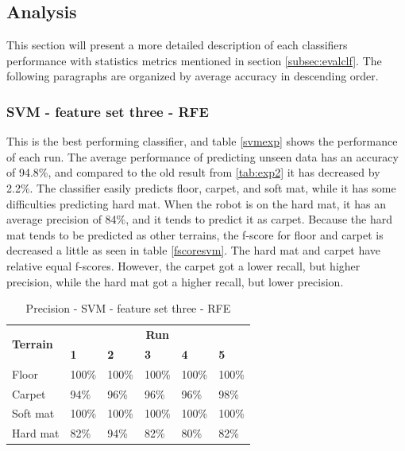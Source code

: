 \documentclass[USenglish]{ifimaster}  %
\begin{document}
\subsection{Analysis}
This section will present a more detailed description of each classifiers performance with statistics metrics mentioned in section \ref{subsec:evalclf}. The following paragraphs are organized by average accuracy in descending order.
\newpage

\subsubsection{SVM - feature set three - RFE} \label{sb:svmwrapper}
This is the best performing classifier, and table \ref{svmexp} shows the performance of each run. The average performance of predicting unseen data has an accuracy of 94.8\%, and compared to the old result from \ref{tab:exp2} it has decreased by 2.2\%. The classifier easily predicts floor, carpet, and soft mat, while it has some difficulties predicting hard mat. When the robot is on the hard mat, it has an average precision of 84\%, and it tends to predict it as carpet. Because the hard mat tends to be predicted as other terrains, the f-score for floor and carpet is decreased a little as seen in table \ref{fscoresvm}. The hard mat and carpet have relative equal f-scores. However, the carpet got a lower recall, but higher precision, while the hard mat got a higher recall, but lower precision.

\begin{table}[h]
	\begin{subtable}[h]{1\textwidth}
		\centering
		\captionsetup{justification=centering}
		\begin{tabular}{@{}llllll@{}}
			\toprule
			\multirow{2}{*}{\textbf{Terrain}} & \multicolumn{5}{c}{\textbf{Run}} \\ \cmidrule(l){2-6} 
			& \multicolumn{1}{l|}{\textbf{1}} & \multicolumn{1}{l|}{\textbf{2}} & \multicolumn{1}{l|}{\textbf{3}} & \multicolumn{1}{l|}{\textbf{4}} & \textbf{5} \\ \midrule
			\multicolumn{1}{l|}{Floor} & \multicolumn{1}{l|}{100\%} & \multicolumn{1}{l|}{100\%} & \multicolumn{1}{l|}{100\%} & \multicolumn{1}{l|}{100\%} & 100\% \\ \midrule
			\multicolumn{1}{l|}{Carpet} & \multicolumn{1}{l|}{94\%} & \multicolumn{1}{l|}{96\%} & \multicolumn{1}{l|}{96\%} & \multicolumn{1}{l|}{96\%} & 98\% \\ \midrule
			\multicolumn{1}{l|}{Soft mat} & \multicolumn{1}{l|}{100\%} & \multicolumn{1}{l|}{100\%} & \multicolumn{1}{l|}{100\%} & \multicolumn{1}{l|}{100\%} & 100\% \\ \midrule
			\multicolumn{1}{l|}{Hard mat} & \multicolumn{1}{l|}{82\%} & \multicolumn{1}{l|}{94\%} & \multicolumn{1}{l|}{82\%} & \multicolumn{1}{l|}{80\%} & 82\% \\ \bottomrule
		\end{tabular}
		\caption{Precision - SVM - feature set three - RFE}
		\label{pressvm}
	\end{subtable}
\end{table}
\end{document}

